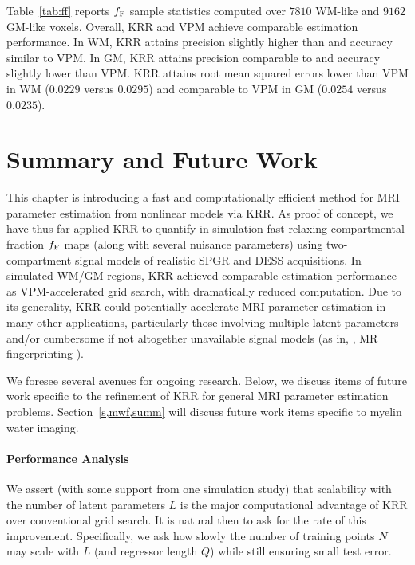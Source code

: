 Table~\ref{tab:ff} reports $f_{\mathrm{F}}$ sample statistics 
computed over $7810$ WM-like and $9162$ GM-like voxels. 
Overall, 
KRR and VPM achieve comparable estimation performance.
In WM,
KRR attains precision slightly higher than
and accuracy similar to VPM.
In GM,
KRR attains precision comparable to
and accuracy slightly lower than VPM.
KRR attains root mean squared errors
lower than VPM in WM ($0.0229$ versus $0.0295$)
and comparable to VPM in GM ($0.0254$ versus $0.0235$).

\section{Summary and Future Work}
\label{s,krr,summ}

This chapter is introducing
a fast and computationally efficient method
for MRI parameter estimation
from nonlinear models
via KRR.
As proof of concept,
we have thus far applied KRR
to quantify in simulation
fast-relaxing compartmental fraction $f_{\mathrm{F}}$ maps
(along with several nuisance parameters)
using two-compartment signal models
of realistic SPGR and DESS acquisitions.
In simulated \ffest WM/GM regions,
KRR achieved comparable estimation performance
as VPM-accelerated grid search,
with dramatically reduced computation.
Due to its generality,
KRR could potentially accelerate
MRI parameter estimation
in many other applications,
particularly those
involving multiple latent parameters
and/or
cumbersome if not altogether unavailable signal models
(as in, \eg, MR fingerprinting \cite{ma:13:mrf}).

We foresee several avenues for ongoing research.
Below, we discuss items of future work 
specific to the refinement of KRR 
for general MRI parameter estimation problems.
Section~\ref{s,mwf,summ} will discuss
future work items specific to myelin water imaging.

\paragraph{Performance Analysis}
We assert 
(with some support from one simulation study)
that scalability
with the number of latent parameters $L$
is the major computational advantage
of KRR over conventional grid search.
It is natural then to ask
for the rate of this improvement.
Specifically,
we ask how slowly the number
of training points $N$ may scale 
with $L$ (and regressor length $Q$) 
while still ensuring small test error.

